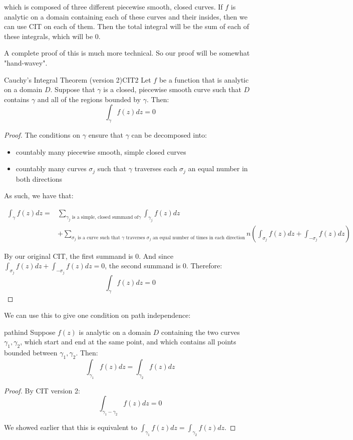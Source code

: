 \noin which is composed of three different piecewise smooth, closed curves. If $f$ is analytic on a domain containing each of these curves and their insides, then we can use CIT on each of them. Then the total integral will be the sum of each of these integrals, which will be $0$.

A complete proof of this is much more technical. So our proof will be somewhat "hand-wavey".

\begin{thmbo}{Cauchy's Integral Theorem (version 2)}{CIT2} Let $f$ be a function that is analytic on a domain $D$. Suppose that $\gamma$ is a closed, piecewise smooth curve such that $D$ contains $\gamma$ and all of the regions bounded by $\gamma$. Then:
$$\int_{\gamma}f(z)dz = 0$$
\end{thmbo}

\begin{proof} The conditions on $\gamma$ ensure that $\gamma$ can be decomposed into:

\begin{itemize} 
\item countably many piecewise smooth, simple closed curves
\item countably many curves $\sigma_j$ such that $\gamma$ traverses each $\sigma_j$ an equal number in both directions
\end{itemize}

As such, we have that:

\begin{align*}\int_{\gamma}f(z)dz =& \sum_{\gamma_j \text{ is a simple, closed summand of} \gamma} \int_{\gamma_j}f(z)dz \\&+ \sum_{\sigma_j \text{ is a curve such that $\gamma$ traverses $\sigma_j$ an equal number of times in each direction}} n\left(\int_{\sigma_j} f(z)dz + \int_{-\sigma_j}f(z)dz\right)
\end{align*}

By our original CIT, the first summand is $0$. And since $\int_{\sigma_j}f(z)dz + \int_{-\sigma_j}f(z)dz = 0$, the second summand is $0$. Therefore:
$$\int_{\gamma}f(z)dz = 0$$

\end{proof}

We can use this to give one condition on path independence:

\begin{thmbo}{}{pathind} Suppose $f(z)$ is analytic on a domain $D$ containing the two curves $\gamma_1,\gamma_2$, which start and end at the same point, and which contains all points bounded between $\gamma_1,\gamma_2$. Then:
$$\int_{\gamma_1}f(z)dz = \int_{\gamma_2}f(z)dz$$
\end{thmbo}

\begin{proof} By CIT version 2:
$$\int_{\gamma_1 - \gamma_2}f(z)dz = 0$$

We showed earlier that this is equivalent to $\int_{\gamma_1}f(z)dz  =\int_{\gamma_2}f(z)dz$.
\end{proof}

